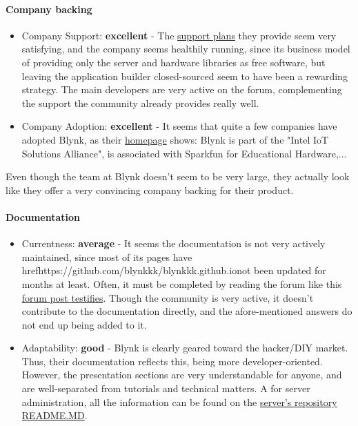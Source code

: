 \documentclass{article}
\begin{document}
\paragraph{Company backing}

\begin{itemize}
\item Company Support: \textbf{excellent} - The \href{http://www.blynk.io/plans/}{support plans} they provide seem very satisfying, and the company seems healthily running, since its business model of providing only the server and hardware libraries as free software, but leaving the application builder closed-sourced seem to have been a rewarding strategy. The main developers are very active on the forum, complementing the support the community already provides really well.
\item Company Adoption: \textbf{excellent} - It seems that quite a few companies have adopted Blynk, as their \href{http://www.blynk.io/#home}{homepage} shows: Blynk is part of the "Intel IoT Solutions Alliance", is associated with Sparkfun for Educational Hardware,...
\end{itemize}

Even though the team at Blynk doesn't seem to be very large, they actually look like they offer a very convincing company backing for their product.

\paragraph{Documentation}

\begin{itemize}
\item Currentness: \textbf{average} - It seems the documentation is not very actively maintained, since most of its pages have \\href{https://github.com/blynkkk/blynkkk.github.io}{not been updated for months} at least. Often, it must be completed by reading the forum like this \href{https://community.blynk.cc/t/solved-issues-installing-and-running-blynk-client-on-rpi/11196/12}{forum post testifies}. Though the community is very active, it doesn't contribute to the documentation directly, and the afore-mentioned answers do not end up being added to it.
\item Adaptability: \textbf{good} - Blynk is clearly geared toward the hacker/DIY market. Thus, their documentation reflects this, being more developer-oriented. However, the presentation sections are very understandable for anyone, and are well-separated from tutorials and technical matters. A for server administration, all the information can be found on the \href{https://github.com/blynkkk/blynk-server#requirements}{server's repository README.MD}.
\end{itemize}
\end{document}
